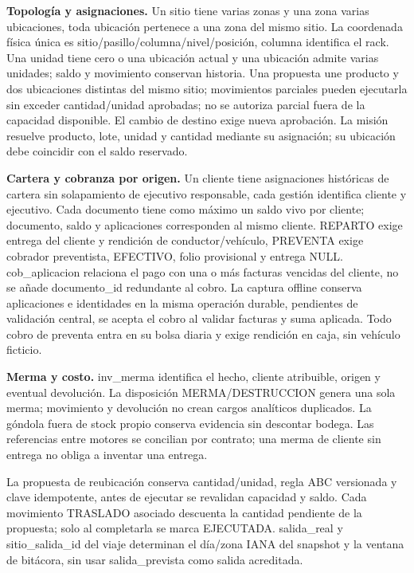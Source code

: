 \textbf{Topología y asignaciones.} Un sitio tiene varias zonas y una zona varias ubicaciones, toda ubicación pertenece a una zona del mismo sitio. La coordenada física única es sitio/pasillo/columna/nivel/posición, columna identifica el rack. Una unidad tiene cero o una ubicación actual y una ubicación admite varias unidades; saldo y movimiento conservan historia. Una propuesta une producto y dos ubicaciones distintas del mismo sitio; movimientos parciales pueden ejecutarla sin exceder cantidad/unidad aprobadas; no se autoriza parcial fuera de la capacidad disponible. El cambio de destino exige nueva aprobación. La misión resuelve producto, lote, unidad y cantidad mediante su asignación; su ubicación debe coincidir con el saldo reservado.

\textbf{Cartera y cobranza por origen.} Un cliente tiene asignaciones históricas de cartera sin solapamiento de ejecutivo responsable, cada gestión identifica cliente y ejecutivo. Cada documento tiene como máximo un saldo vivo por cliente; documento, saldo y aplicaciones corresponden al mismo cliente. REPARTO exige entrega del cliente y rendición de conductor/vehículo, PREVENTA exige cobrador preventista, EFECTIVO, folio provisional y entrega NULL. cob\_aplicacion relaciona el pago con una o más facturas vencidas del cliente, no se añade documento\_id redundante al cobro. La captura offline conserva aplicaciones e identidades en la misma operación durable, pendientes de validación central, se acepta el cobro al validar facturas y suma aplicada. Todo cobro de preventa entra en su bolsa diaria y exige rendición en caja, sin vehículo ficticio.

\textbf{Merma y costo.} inv\_merma identifica el hecho, cliente atribuible, origen y eventual devolución. La disposición MERMA/DESTRUCCION genera una sola merma; movimiento y devolución no crean cargos analíticos duplicados. La góndola fuera de stock propio conserva evidencia sin descontar bodega. Las referencias entre motores se concilian por contrato; una merma de cliente sin entrega no obliga a inventar una entrega.

La propuesta de reubicación conserva cantidad/unidad, regla ABC versionada y clave idempotente, antes de ejecutar se revalidan capacidad y saldo. Cada movimiento TRASLADO asociado descuenta la cantidad pendiente de la propuesta; solo al completarla se marca EJECUTADA. salida\_real y sitio\_salida\_id del viaje determinan el día/zona IANA del snapshot y la ventana de bitácora, sin usar salida\_prevista como salida acreditada.

